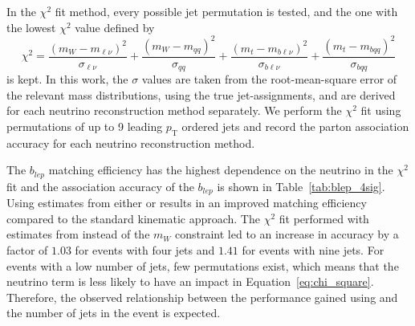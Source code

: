 In the $\chi^2$ fit method, every possible jet permutation is tested, and the one with the lowest $\chi^2$ value defined by
\begin{equation}
    \chi^2=\frac{(m_W-m_{\ell\nu})^2}{\sigma_{\ell\nu}} +\frac{(m_W-m_{qq})^2}{\sigma_{qq}} +\frac{(m_t-m_{b\ell\nu})^2}{\sigma_{b\ell\nu}} +\frac{(m_t-m_{bqq})^2}{\sigma_{bqq}}
    \label{eq:chi_square}
\end{equation}
is kept.
In this work, the $\sigma$ values are taken from the root-mean-square error of the relevant mass distributions, using the true jet-assignments, and are derived for each neutrino reconstruction method separately.
We perform the $\chi^2$ fit using permutations of up to 9 leading $p_{\mathrm{T}}$ ordered jets and record the parton association accuracy for each neutrino reconstruction method.

The $b_{lep}$ matching efficiency has the highest dependence on the neutrino in the $\chi^2$ fit and the association accuracy of the $b_{lep}$ is shown in Table~\ref{tab:blep_4sig}.
Using estimates from either \nusample{} or \numode{} results in an improved matching efficiency compared to the standard kinematic approach.
The $\chi^2$ fit performed with estimates from \numode{} instead of the $m_W$ constraint led to an increase in accuracy by a factor of $1.03$ for events with four jets and $1.41$ for events with nine jets.
For events with a low number of jets, few permutations exist, which means that the neutrino term is less likely to have an impact in Equation~\ref{eq:chi_square}.
Therefore, the observed relationship between the performance gained using \nuflow{} and the number of jets in the event is expected.
